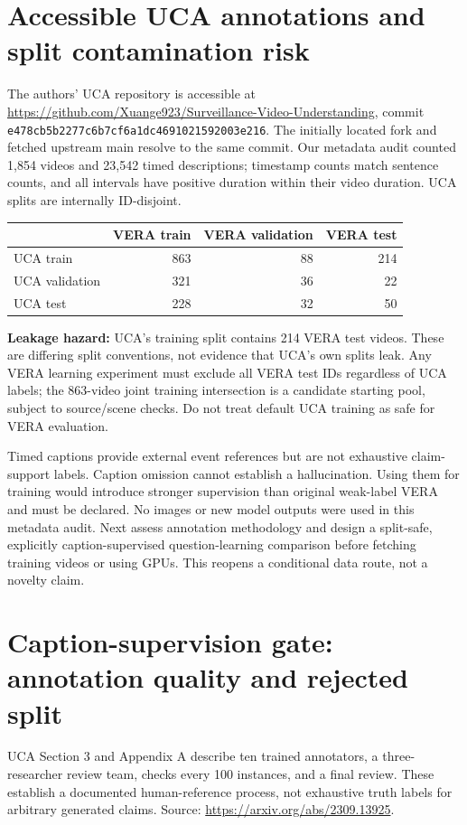 \documentclass[11pt]{article}
\begin{document}
\section{Accessible UCA annotations and split contamination risk}
The authors' UCA repository is accessible at
\url{https://github.com/Xuange923/Surveillance-Video-Understanding},
commit \texttt{e478cb5b2277c6b7cf6a1dc4691021592003e216}.
The initially located fork and fetched upstream main resolve to the same commit.
Our metadata audit counted 1,854 videos and 23,542 timed descriptions; timestamp counts match sentence counts, and all intervals have positive duration within their video duration. UCA splits are internally ID-disjoint.

\begin{center}\begin{tabular}{lrrr}\toprule
 & VERA train & VERA validation & VERA test\\\midrule
UCA train &863&88&214\\
UCA validation &321&36&22\\
UCA test &228&32&50\\\bottomrule\end{tabular}\end{center}

\textbf{Leakage hazard:} UCA's training split contains 214 VERA test videos. These are differing split conventions, not evidence that UCA's own splits leak. Any VERA learning experiment must exclude all VERA test IDs regardless of UCA labels; the 863-video joint training intersection is a candidate starting pool, subject to source/scene checks. Do not treat default UCA training as safe for VERA evaluation.

Timed captions provide external event references but are not exhaustive claim-support labels. Caption omission cannot establish a hallucination. Using them for training would introduce stronger supervision than original weak-label VERA and must be declared. No images or new model outputs were used in this metadata audit. Next assess annotation methodology and design a split-safe, explicitly caption-supervised question-learning comparison before fetching training videos or using GPUs. This reopens a conditional data route, not a novelty claim.


\section{Caption-supervision gate: annotation quality and rejected split}
UCA Section 3 and Appendix A describe ten trained annotators, a three-researcher review team, checks every 100 instances, and a final review. These establish a documented human-reference process, not exhaustive truth labels for arbitrary generated claims. Source: \url{https://arxiv.org/abs/2309.13925}.
\end{document}
